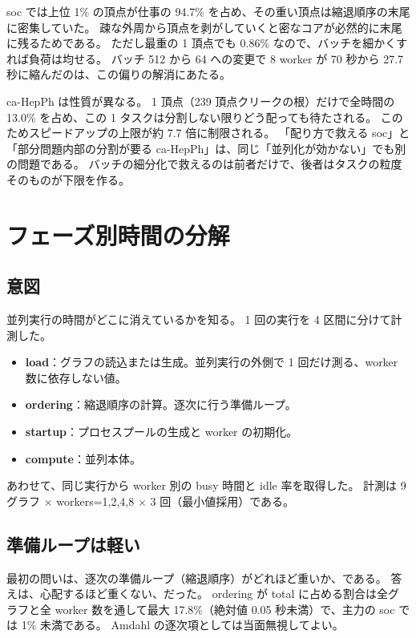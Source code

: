 soc では上位 1\% の頂点が仕事の 94.7\% を占め、その重い頂点は縮退順序の末尾に密集していた。
疎な外周から頂点を剥がしていくと密なコアが必然的に末尾に残るためである。
ただし最重の 1 頂点でも 0.86\% なので、バッチを細かくすれば負荷は均せる。
バッチ 512 から 64 への変更で 8 worker が 70 秒から 27.7 秒に縮んだのは、この偏りの解消にあたる。

ca-HepPh は性質が異なる。
1 頂点（239 頂点クリークの根）だけで全時間の 13.0\% を占め、この 1 タスクは分割しない限りどう配っても待たされる。
このためスピードアップの上限が約 7.7 倍に制限される。
「配り方で救える soc」と「部分問題内部の分割が要る ca-HepPh」は、同じ「並列化が効かない」でも別の問題である。
バッチの細分化で救えるのは前者だけで、後者はタスクの粒度そのものが下限を作る。

\section{フェーズ別時間の分解}
\label{sec:phase}

\subsection{意図}

並列実行の時間がどこに消えているかを知る。
1 回の実行を 4 区間に分けて計測した。

\begin{itemize}
  \item \textbf{load}：グラフの読込または生成。並列実行の外側で 1 回だけ測る、worker 数に依存しない値。
  \item \textbf{ordering}：縮退順序の計算。逐次に行う準備ループ。
  \item \textbf{startup}：プロセスプールの生成と worker の初期化。
  \item \textbf{compute}：並列本体。
\end{itemize}

あわせて、同じ実行から worker 別の busy 時間と idle 率を取得した。
計測は 9 グラフ $\times$ workers=1,2,4,8 $\times$ 3 回（最小値採用）である。

\subsection{準備ループは軽い}

最初の問いは、逐次の準備ループ（縮退順序）がどれほど重いか、である。
答えは、心配するほど重くない、だった。
ordering が total に占める割合は全グラフと全 worker 数を通して最大 17.8\%（絶対値 0.05 秒未満）で、主力の soc では 1\% 未満である。
Amdahl の逐次項としては当面無視してよい。

